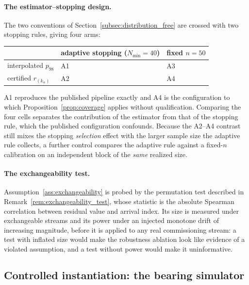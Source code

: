 \documentclass[a4paper]{cas-sc}
\newcommand{\residual}{\ensuremath{r}}
\begin{document}
\paragraph{The estimator--stopping design.}
The two conventions of
Section~\ref{subsec:distribution_free} are crossed with two stopping rules,
giving four arms:

\begin{center}
\begin{tabular}{lll}
\toprule
 & adaptive stopping (\(N_{\min}=40\)) & fixed \(n=50\) \\
\midrule
interpolated \(p_{98}\)                 & A1 & A3 \\
certified \(\residual_{(k_\alpha)}\)    & A2 & A4 \\
\bottomrule
\end{tabular}
\end{center}

\noindent
A1 reproduces the published pipeline exactly and A4 is the configuration to
which Proposition~\ref{prop:coverage} applies without qualification.
Comparing the four cells separates the contribution of the estimator from that
of the stopping rule, which the published configuration confounds. Because the
A2--A4 contrast still mixes the stopping \emph{selection} effect with the
larger sample size the adaptive rule collects, a further control compares the
adaptive rule against a fixed-\(n\) calibration on an independent block of the
\emph{same} realized size.

\paragraph{The exchangeability test.}
Assumption~\ref{ass:exchangeability} is probed by the permutation test
described in Remark~\ref{rem:exchangeability_test}, whose statistic is the
absolute Spearman correlation between residual value and arrival index. Its
size is measured under exchangeable streams and its power under an injected
monotone drift of increasing magnitude, before it is applied to any real
commissioning stream: a test with inflated size would make the robustness
ablation look like evidence of a violated assumption, and a test without power
would make it uninformative.

\subsection{Controlled instantiation: the bearing simulator}
\label{subsec:design_simulator}
\end{document}
